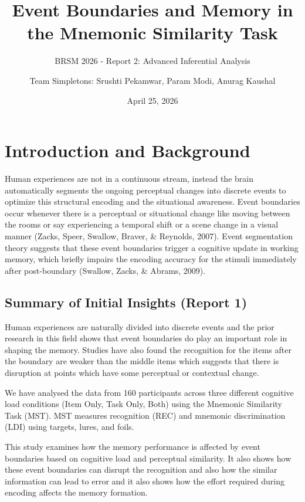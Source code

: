 \documentclass[
  12pt,
]{article}
\title{Event Boundaries and Memory in the Mnemonic Similarity Task}
\subtitle{BRSM 2026 - Report 2: Advanced Inferential Analysis}
\author{Team Simpletons: Srushti Pekamwar, Param Modi, Anurag Kaushal}
\date{April 25, 2026}
\begin{document}
\maketitle

\section{Introduction and Background}\label{introduction-and-background}

Human experiences are not in a continuous stream, instead the brain automatically segments the ongoing perceptual changes into discrete events to optimize this structural encoding and the situational awareness. Event boundaries occur whenever there is a perceptual or situational change like moving between the rooms or say experiencing a temporal shift or a scene change in a visual manner (Zacks, Speer, Swallow, Braver, & Reynolds, 2007). Event segmentation theory suggests that these event boundaries trigger a cognitive update in working memory, which briefly impairs the encoding accuracy for the stimuli immediately after post-boundary (Swallow, Zacks, & Abrams, 2009).


\subsection{Summary of Initial Insights (Report
1)}\label{summary-of-initial-insights-report-1}

Human experiences are naturally divided into discrete events and the prior research in this field shows that event boundaries do play an important role in shaping the memory. Studies have also found the recognition for the items after the boundary are weaker than the middle items which suggests that there is disruption at points which have some perceptual or contextual change. 

We have analysed the data from 160 participants across three different cognitive load conditions (Item Only, Task Only, Both) using the Mnemonic Similarity Task (MST). MST measures recognition (REC) and mnemonic discrimination (LDI) using targets, lures, and foils. 

This study examines how the memory performance is affected by event boundaries based on cognitive load and perceptual similarity. It also shows how these event boundaries can disrupt the recognition and also how the similar information can lead to error and it also shows how the effort required during encoding affects the memory formation.
\end{document}
